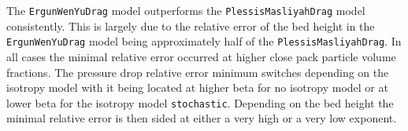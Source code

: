 The \lstinline|ErgunWenYuDrag| model outperforms the \lstinline|PlessisMasliyahDrag| model consistently.
This is largely due to the relative error of the bed height in the \lstinline|ErgunWenYuDrag| model being approximately half of the \lstinline|PlessisMasliyahDrag|.
In all cases the minimal relative error occurred at higher close pack particle volume fractions. The pressure drop relative error minimum switches depending on the isotropy model with it being located at higher beta for no isotropy model or at lower beta for the isotropy model \lstinline|stochastic|. Depending on the bed height the minimal relative error is then sided at either a very high or a very low exponent.







